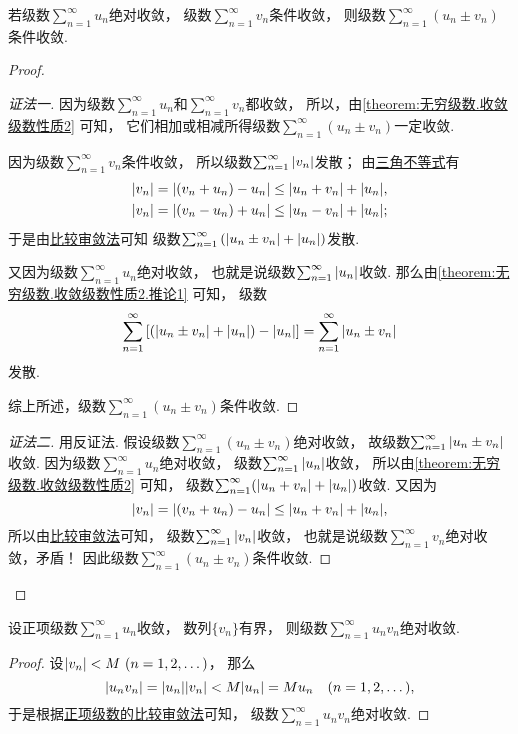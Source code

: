 \begin{proposition}\label{theorem:绝对收敛.命题1}
若级数\(\sum_{n=1}^\infty u_n\)绝对收敛，
级数\(\sum_{n=1}^\infty v_n\)条件收敛，
则级数\(\sum_{n=1}^\infty (u_n \pm v_n)\)条件收敛.
\begin{proof}
\begin{proof}[证法一]
因为级数\(\sum_{n=1}^\infty u_n\)和\(\sum_{n=1}^\infty v_n\)都收敛，
所以，由\cref{theorem:无穷级数.收敛级数性质2} 可知，
它们相加或相减所得级数\(\sum_{n=1}^\infty (u_n \pm v_n)\)一定收敛.

因为级数\(\sum_{n=1}^\infty v_n\)条件收敛，
所以级数\(\sum_{n=1}^\infty \abs{v_n}\)发散；
由\hyperref[theorem:不等式.三角不等式1]{三角不等式}有\begin{align*}
	\abs{v_n}
	= \abs{(v_n + u_n) - u_n}
	\leq \abs{u_n + v_n} + \abs{u_n}, \\
	\abs{v_n}
	= \abs{(v_n - u_n) + u_n}
	\leq \abs{u_n - v_n} + \abs{u_n};
\end{align*}
于是由\hyperref[theorem:无穷级数.正项级数的比较审敛法]{比较审敛法}可知
级数\(\sum_{n=1}^\infty \left( \abs{u_n \pm v_n} + \abs{u_n} \right)\)发散.

又因为级数\(\sum_{n=1}^\infty u_n\)绝对收敛，
也就是说级数\(\sum_{n=1}^\infty \abs{u_n}\)收敛.
那么由\cref{theorem:无穷级数.收敛级数性质2.推论1} 可知，
级数\[
	\sum_{n=1}^\infty \left[
		\left( \abs{u_n \pm v_n} + \abs{u_n} \right) - \abs{u_n}
	\right]
	= \sum_{n=1}^\infty \abs{u_n \pm v_n}
\]发散.

综上所述，级数\(\sum_{n=1}^\infty (u_n \pm v_n)\)条件收敛.
\end{proof}
\begin{proof}[证法二]
用反证法.
假设级数\(\sum_{n=1}^\infty (u_n \pm v_n)\)绝对收敛，
故级数\(\sum_{n=1}^\infty \abs{u_n \pm v_n}\)收敛.
因为级数\(\sum_{n=1}^\infty u_n\)绝对收敛，
级数\(\sum_{n=1}^\infty \abs{u_n}\)收敛，
所以由\cref{theorem:无穷级数.收敛级数性质2} 可知，
级数\(\sum_{n=1}^\infty (\abs{u_n + v_n} + \abs{u_n})\)收敛.
又因为\[
	\abs{v_n}
	= \abs{(v_n + u_n) - u_n}
	\leq \abs{u_n + v_n} + \abs{u_n},
\]
所以由\hyperref[theorem:无穷级数.正项级数的比较审敛法]{比较审敛法}可知，
级数\(\sum_{n=1}^\infty \abs{v_n}\)收敛，
也就是说级数\(\sum_{n=1}^\infty v_n\)绝对收敛，矛盾！
因此级数\(\sum_{n=1}^\infty (u_n \pm v_n)\)条件收敛.
\end{proof}\let\qed\relax
\end{proof}
\end{proposition}

\begin{proposition}\label{theorem:绝对收敛.命题2}
设正项级数\(\sum_{n=1}^\infty u_n\)收敛，
数列\(\{v_n\}\)有界，
则级数\(\sum_{n=1}^\infty u_n v_n\)绝对收敛.
\begin{proof}
设\(\abs{v_n} < M\ (n=1,2,\dotsc)\)，
那么\[
	\abs{u_n v_n}
	= \abs{u_n} \abs{v_n}
	< M \abs{u_n}
	= M u_n
	\quad(n=1,2,\dotsc),
\]
于是根据\hyperref[theorem:无穷级数.正项级数的比较审敛法的推论]{正项级数的比较审敛法}可知，
级数\(\sum_{n=1}^\infty u_n v_n\)绝对收敛.
\end{proof}
\end{proposition}

